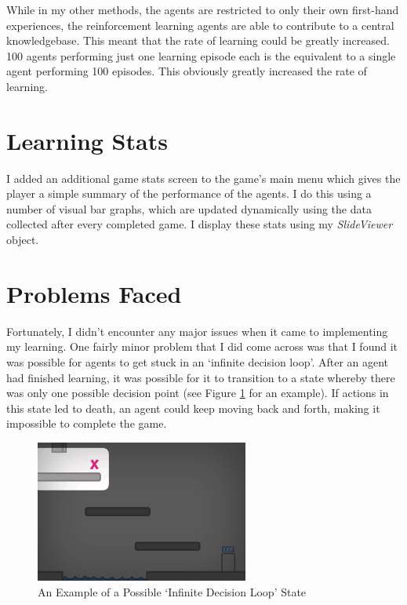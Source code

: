 \documentclass[a4paper,oneside]{report}
\begin{document}
While in my other methods, the agents are restricted to only their own first-hand experiences, the reinforcement learning agents are able to contribute to a central knowledgebase. This meant that the rate of learning could be greatly increased. 100 agents performing just one learning episode each is the equivalent to a single agent performing 100 episodes. This obviously greatly increased the rate of learning.

\section{Learning Stats}

I added an additional game stats screen to the game's main menu which gives the player a simple summary of the performance of the agents. I do this using a number of visual bar graphs, which are updated dynamically using the data collected after every completed game. I display these stats using my \emph{SlideViewer} object.

\section{Problems Faced}
	
Fortunately, I didn't encounter any major issues when it came to implementing my learning. One fairly minor problem that I did come across was that I found it was possible for agents to get stuck in an `infinite decision loop'. After an agent had finished learning, it was possible for it to transition to a state whereby there was only one possible decision point (see Figure \ref{fig:InfiniteDecisionLoop} for an example). If actions in this state led to death, an agent could keep moving back and forth, making it impossible to complete the game.

\begin{figure}
  \centering
    \includegraphics[width=70mm]{sources/images/Screen_InfiniteLoop}
    \caption{An Example of a Possible `Infinite Decision Loop' State}
    \label{fig:InfiniteDecisionLoop}
\end{figure}
\end{document}

